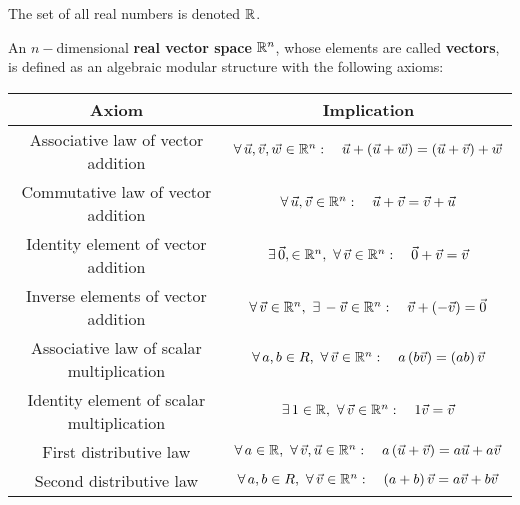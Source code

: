 \documentclass{article}
\begin{document}
		\begin{defn}
			The set of all real numbers is denoted $\mathbb{R}$.
		\end{defn}
		\begin{defn}
			An $n-$dimensional \textbf{real vector space} $\mathbb{R}^n$, whose elements are called \textbf{vectors}, is defined as an algebraic modular structure with the following axioms:
			\begin{table}[h]
				\begin{tabular}{|c|c|}
					\hline
					\textbf{Axiom} & \textbf{Implication} \\ \hline
					Associative law of vector addition & $\forall \, \vec{u}, \vec{v}, \vec{w} \in \mathbb{R}^n: \quad \vec{u} + \left(\vec{u} + \vec{w}\right) = \left(\vec{u} + \vec{v}\right) + \vec{w}$ \\ \hline
					Commutative law of vector addition & $\forall \, \vec{u}, \vec{v} \in \mathbb{R}^n: \quad \vec{u} + \vec{v} = \vec{v} + \vec{u}$ \\ \hline
					Identity element of vector addition & $\exists\, \vec{0}, \in \mathbb{R}^n, \,\, \forall \, \vec{v} \in \mathbb{R}^n: \quad \vec{0} + \vec{v} = \vec{v}$ \\ \hline
					Inverse elements of vector addition & $\forall \, \vec{v} \in \mathbb{R}^n, \,\, \exists\, -\vec{v} \in \mathbb{R}^n: \quad \vec{v} + \left(-\vec{v}\right) = \vec{0}$ \\ \hline
					Associative law of scalar multiplication & $\forall \,a, b \in R, \,\, \forall\, \vec{v} \in \mathbb{R}^n: \quad a\left(b\vec{v}\right) = \left(ab\right) \vec{v}$ \\ \hline
					Identity element of scalar multiplication & $\exists \,1 \in \mathbb{R}, \,\,\forall\, \vec{v} \in \mathbb{R}^n:\quad 1\vec{v} = \vec{v}$                     \\ \hline
					First distributive law & $\forall \, a \in \mathbb{R}, \,\, \forall \,\vec{v}, \vec{u} \in \mathbb{R}^n: \quad a\left(\vec{u} + \vec{v}\right) = a\vec{u} + a\vec{v}$ \\ \hline
					Second distributive law & $\forall \, a, b \in R, \,\, \forall \, \vec{v} \in \mathbb{R}^n: \quad \left(a+b\right) \vec{v} = a\vec{v} + b\vec{v}$\\ \hline
				\end{tabular}
			\end{table}
		\end{defn}
\end{document}
